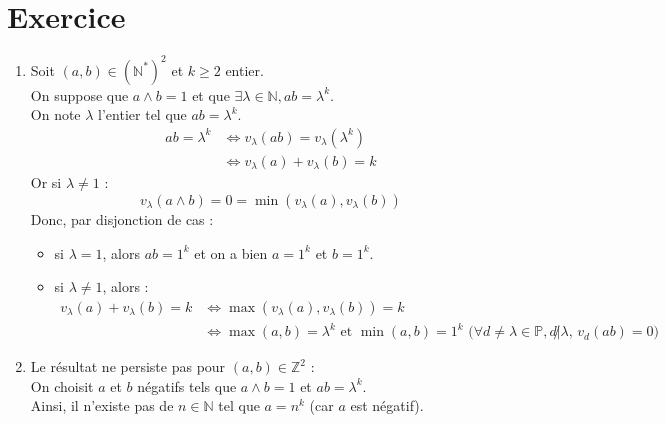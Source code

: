 \documentclass{report}
\begin{document}
\section{Exercice}
\begin{enumerate}
    \item Soit $(a,b) \in (\mathbb{N}^*)^2$ et $k \geq 2$ entier. \\
    On suppose que $a \wedge b = 1$ et que $\exists \lambda \in \mathbb{N}, ab = \lambda^k$. \\
    On note $\lambda$ l'entier tel que $ab = \lambda^k$. \\
    \begin{align*}
        ab = \lambda^k &\Leftrightarrow v_{\lambda}(ab) = v_\lambda(\lambda^k) \\
        &\Leftrightarrow v_\lambda(a) + v_\lambda(b) = k
    \end{align*}
    Or si $\lambda \neq 1$ : $$v_\lambda(a \wedge b) = 0 = \min(v_\lambda(a), v_\lambda(b))$$
    Donc, par disjonction de cas : 
    \begin{itemize}
        \item si $\lambda = 1$, alors $ab = 1^k$ et on a bien $a = 1^k$ et $b = 1^k$.
        \item si $\lambda \neq 1$, alors : 
        \begin{align*}
            v_\lambda(a) + v_\lambda(b) = k &\Leftrightarrow \max(v_\lambda(a), v_\lambda(b)) = k \\
            &\Leftrightarrow \max(a, b) = \lambda^k \text{ et } \min(a,b) = 1^k \text{ ($\forall d \neq \lambda \in \mathbb{P}, d \not | \lambda$, $v_d(ab) = 0$)}
        \end{align*}
    \end{itemize}

    \item Le résultat ne persiste pas pour $(a,b) \in \mathbb{Z}^2$ :  \\
    On choisit $a$ et $b$ négatifs tels que $a \wedge b = 1$ et $ab = \lambda^k$. \\
    Ainsi, il n'existe pas de $n \in \mathbb{N}$ tel que $a = n^k$ (car $a$ est négatif).

\end{enumerate}
\end{document}

